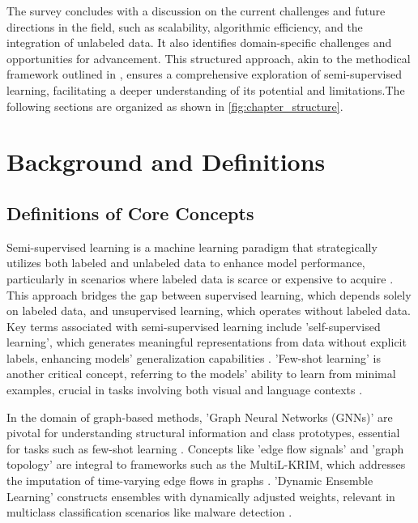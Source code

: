 The survey concludes with a discussion on the current challenges and future directions in the field, such as scalability, algorithmic efficiency, and the integration of unlabeled data. It also identifies domain-specific challenges and opportunities for advancement. This structured approach, akin to the methodical framework outlined in \cite{alabi2019learningprunespeedingrepeated}, ensures a comprehensive exploration of semi-supervised learning, facilitating a deeper understanding of its potential and limitations.The following sections are organized as shown in \autoref{fig:chapter_structure}.








\section{Background and Definitions} \label{sec:Background and Definitions}



\subsection{Definitions of Core Concepts} \label{subsec:Definitions of Core Concepts}

Semi-supervised learning is a machine learning paradigm that strategically utilizes both labeled and unlabeled data to enhance model performance, particularly in scenarios where labeled data is scarce or expensive to acquire \cite{wang2022rethinkingminimalsufficientrepresentation}. This approach bridges the gap between supervised learning, which depends solely on labeled data, and unsupervised learning, which operates without labeled data. Key terms associated with semi-supervised learning include 'self-supervised learning', which generates meaningful representations from data without explicit labels, enhancing models' generalization capabilities \cite{ginzburg2021selfsuperviseddocumentsimilarityranking}. 'Few-shot learning' is another critical concept, referring to the models' ability to learn from minimal examples, crucial in tasks involving both visual and language contexts \cite{ge2024psppretrainingstructureprompt}.



In the domain of graph-based methods, 'Graph Neural Networks (GNNs)' are pivotal for understanding structural information and class prototypes, essential for tasks such as few-shot learning \cite{ge2024psppretrainingstructureprompt}. Concepts like 'edge flow signals' and 'graph topology' are integral to frameworks such as the MultiL-KRIM, which addresses the imputation of time-varying edge flows in graphs \cite{nguyen2024imputationtimevaryingedgeflows}. 'Dynamic Ensemble Learning' constructs ensembles with dynamically adjusted weights, relevant in multiclass classification scenarios like malware detection \cite{m2023comparativeanalysisimbalancedmalware}.



